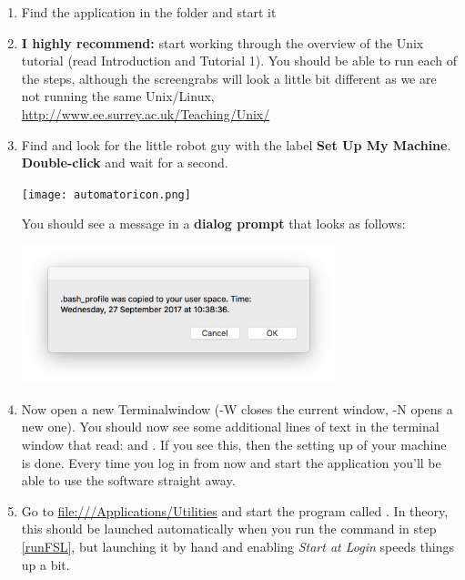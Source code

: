\begin{enumerate}

	\item Find the  application in the  folder and start it

	\item \textbf{I highly recommend:} start working through the overview of the Unix tutorial (read Introduction and Tutorial 1). You should be able to run each of the steps, although the screengrabs will look a little bit different as we are not running the same Unix/Linux, \url{http://www.ee.surrey.ac.uk/Teaching/Unix/}
	
	\item Find  and look for the little robot guy with the label \textbf{Set Up My Machine}. \textbf{Double-click} and wait for a second.
	\begin{center}
	\texttt{[image: automatoricon.png]}	
	\end{center}
	
	You should see a message in a \textbf{dialog prompt} that looks as follows: 	
	\begin{center}
	\includegraphics[height=4cm]{path-message.png}	
	\end{center}
	
	
	\item Now open a new Terminalwindow (\cmd-W closes the current window, \cmd-N opens a new one). You should now see some additional lines of text in the terminal window that read:   and . If you see this, then the setting up of your machine is done. Every time you log in from now and start the  application you'll be able to use the software straight away.
	
	\item Go to  \url{file:///Applications/Utilities} and start the program called . In theory, this should be launched automatically when you run the command in step \ref{runFSL}, but launching it by hand and enabling \emph{Start at Login} speeds things up a bit.
	

\end{enumerate}
